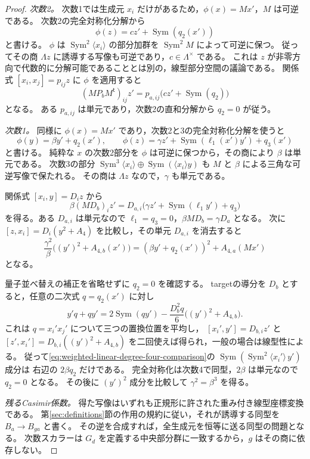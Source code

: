 \begin{proof}
\emph{次数2。}
次数1では生成元 $x_i$ だけがあるため，$\phi(x)=Mx'$，$M$ は可逆である。
次数2の完全対称化分解から
\[
                \phi(z)=cz'+\operatorname{Sym}(q_2(x'))
\]
と書ける。
$\phi$ は $\operatorname{Sym}^2\langle x_i\rangle$ の部分加群を
$\operatorname{Sym}^2M$ によって可逆に保つ。
従ってその商 $\Lambda z$ に誘導する写像も可逆であり，$c\in\Lambda^\times$ である。
これは $z$ が非零方向で代数的に分解可能であることとは別の，線型部分空間の議論である。
関係式 $[x_i,x_j]=p_{ij}z$ に $\phi$ を適用すると
\[
       (MP_bM^{\mathsf t})_{ij}z'
            =p_{a,ij}\bigl(cz'+\operatorname{Sym}(q_2)\bigr)
\]
となる。
ある $p_{a,ij}$ は単元であり，次数2の直和分解から $q_2=0$ が従う。

\emph{次数1。}
同様に $\phi(x)=Mx'$ であり，次数2と3の完全対称化分解を使うと
\[
 \phi(y)=\beta y'+q_2(x'),\qquad
 \phi(z)=\gamma z'+\operatorname{Sym}(\ell_1(x')y')+q_3(x')
\]
と書ける。
純粋な $x$ の次数2部分を $\phi$ は可逆に保つから，その商により $\beta$ は単元である。
次数3の部分
$\operatorname{Sym}^3\langle x_i\rangle\oplus
\operatorname{Sym}(\langle x_i\rangle y)$ も
$M$ と $\beta$ による三角な可逆写像で保たれる。
その商は $\Lambda z$ なので，$\gamma$ も単元である。

関係式 $[x_i,y]=D_i z$ から
\[
 \beta(MD_b)_i z'
   =D_{a,i}\bigl(\gamma z'+\operatorname{Sym}(\ell_1y')+q_3\bigr)
\]
を得る。ある $D_{a,i}$ は単元なので
$\ell_1=q_3=0$，$\beta MD_b=\gamma D_a$ となる。
次に $[z,x_i]=D_i(y^2+A_4)$ を比較し，その単元 $D_{a,i}$ を消去すると
\begin{equation}\label{eq:weighted-linear-degree-four-comparison}
 \frac{\gamma^2}{\beta}\bigl((y')^2+A_{4,b}(x')\bigr)
   =(\beta y'+q_2(x'))^2+A_{4,a}(Mx')
\end{equation}
となる。

量子並べ替えの補正を省略せずに $q_2=0$ を確認する。
targetの導分を $D_b$ とすると，任意の二次式 $q=q_2(x')$ に対し
\[
 y'q+qy'
  =2\operatorname{Sym}(qy')
       -\frac{D_b^2q}{6}\bigl((y')^2+A_{4,b}\bigr).
\]
これは $q=x_i'x_j'$ について三つの置換位置を平均し，
$[x_i',y']=D_{b,i}z'$ と
$[z',x_i']=D_{b,i}((y')^2+A_{4,b})$ を二回使えば得られ，一般の場合は線型性による。
従って\eqref{eq:weighted-linear-degree-four-comparison}の
$\operatorname{Sym}(\operatorname{Sym}^2\langle x_i'\rangle\, y')$ 成分は
右辺の $2\beta q_2$ だけである。
完全対称化は次数4で同型，$2\beta$ は単元なので $q_2=0$ となる。
その後に $(y')^2$ 成分を比較して $\gamma^2=\beta^3$ を得る。

\emph{残るCasimir係数。}
得た写像はいずれも正規形に許された重み付き線型座標変換である。
第\ref{sec:definitions}節の作用の規約に従い，それが誘導する同型を
$B_a\to B_{ga}$ と書く。
その逆を合成すれば，全生成元を恒等に送る同型の問題となる。
次数スカラーは $G_d$ を定義する中央部分群に一致するから，$g$ はその商に依存しない。


\end{proof}
